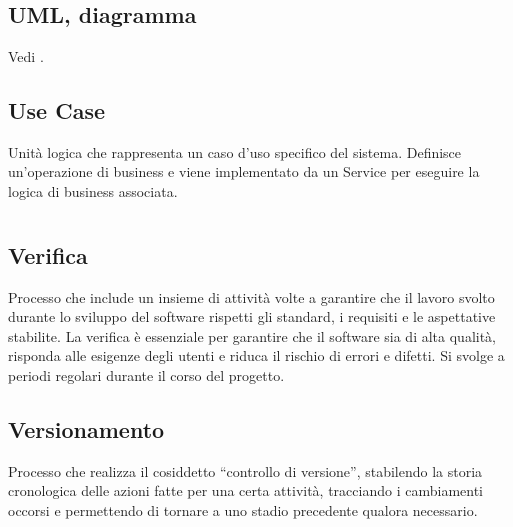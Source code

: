 \newpage



\section{}

\hypertarget{sec:uml}{}
\subsection*{UML, diagramma}
Vedi .

\hypertarget{sec:use case}{}
\subsection*{Use Case}
Unità logica che rappresenta un caso d’uso specifico del sistema. Definisce un’operazione di business e viene implementato da un Service per eseguire la logica di business associata.

\newpage



\section{}

\hypertarget{sec:verifica}{}
\subsection*{Verifica}
Processo che include un insieme di attività volte a garantire che il lavoro svolto durante lo sviluppo del software rispetti gli standard, i requisiti e 
le aspettative stabilite. La verifica è essenziale per garantire che il software sia di alta qualità, risponda alle esigenze degli utenti e riduca il 
rischio di errori e difetti. Si svolge a periodi regolari durante il corso del progetto.

\subsection*{Versionamento}
Processo che realizza il cosiddetto “controllo di versione”, stabilendo la storia cronologica delle azioni fatte per una certa attività, tracciando i 
cambiamenti occorsi e permettendo di tornare a uno stadio precedente qualora necessario.

\hypertarget{sec:view_mvvm}{}
